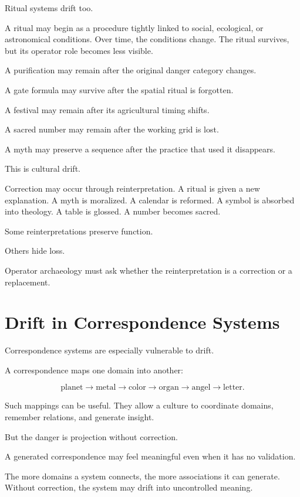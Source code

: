 \documentclass[11pt]{book}
\begin{document}
Ritual systems drift too.

A ritual may begin as a procedure tightly linked to social, ecological, or astronomical conditions. Over time, the conditions change. The ritual survives, but its operator role becomes less visible.

A purification may remain after the original danger category changes.

A gate formula may survive after the spatial ritual is forgotten.

A festival may remain after its agricultural timing shifts.

A sacred number may remain after the working grid is lost.

A myth may preserve a sequence after the practice that used it disappears.

This is cultural drift.

Correction may occur through reinterpretation. A ritual is given a new explanation. A myth is moralized. A calendar is reformed. A symbol is absorbed into theology. A table is glossed. A number becomes sacred.

Some reinterpretations preserve function.

Others hide loss.

Operator archaeology must ask whether the reinterpretation is a correction or a replacement.

\section{Drift in Correspondence Systems}

Correspondence systems are especially vulnerable to drift.

A correspondence maps one domain into another:

\[
\text{planet}
\rightarrow
\text{metal}
\rightarrow
\text{color}
\rightarrow
\text{organ}
\rightarrow
\text{angel}
\rightarrow
\text{letter}.
\]

Such mappings can be useful. They allow a culture to coordinate domains, remember relations, and generate insight.

But the danger is projection without correction.

A generated correspondence may feel meaningful even when it has no validation.

The more domains a system connects, the more associations it can generate. Without correction, the system may drift into uncontrolled meaning.
\end{document}
